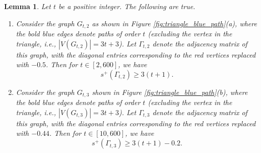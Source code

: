 \documentclass{article}
\newtheorem{lemma}{Lemma}[section]
\begin{document}
\begin{lemma}\label{lem:600-numerics} Let $t$ be a positive integer. The following are true.
\begin{enumerate}[$(i)$]
    \item Consider the graph $G_{t, 2}$ as shown in Figure \emph{\ref{fig:triangle_blue_path}(a)}, where the bold blue edges denote paths of order $t$ (excluding the vertex in the triangle, i.e., $|V(G_{t,2})| = 3t +3$). Let $\Gamma_{t, 2}$ denote the adjacency matrix of this graph, with the diagonal entries corresponding to the red vertices replaced with $-0.5$. Then for $t \in [2, 600]$, we have
    $$s^+(\Gamma_{t, 2}) \geq 3(t + 1).$$
    \item Consider the graph $G_{t, 3}$ shown in Figure \emph{\ref{fig:triangle_blue_path}(b)}, where the bold blue edges denote paths of order $t$ (excluding the vertex in the triangle, i.e., $|V(G_{t,3})| = 3t +3$). Let $\Gamma_{t, 3}$ denote the adjacency matrix of this graph, with the diagonal entries corresponding to the red vertices replaced with $-0.44$. Then for $t \in [10, 600]$, we have
    $$s^+(\Gamma_{t, 3}) \geq 3(t + 1) - 0.2.$$ 
\end{enumerate}
\end{lemma}
\end{document}

